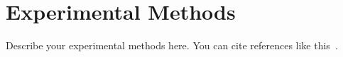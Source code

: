 \section{Experimental Methods}

Describe your experimental methods here. You can cite references like this~\cite{ggplot2}.